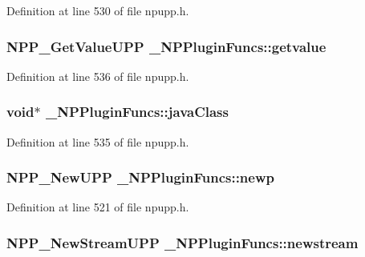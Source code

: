 Definition at line 530 of file npupp.h.

\hypertarget{struct___n_p_plugin_funcs_a15984d23dc460b1ec0c25505ddf00841}{
\subsubsection[{getvalue}]{\setlength{\rightskip}{0pt plus 5cm}NPP\_\-GetValueUPP {\bf \_\-NPPluginFuncs::getvalue}}}
\label{struct___n_p_plugin_funcs_a15984d23dc460b1ec0c25505ddf00841}


Definition at line 536 of file npupp.h.

\hypertarget{struct___n_p_plugin_funcs_af5b980573ff4092423a02ec7bc742f60}{
\subsubsection[{javaClass}]{\setlength{\rightskip}{0pt plus 5cm}void$\ast$ {\bf \_\-NPPluginFuncs::javaClass}}}
\label{struct___n_p_plugin_funcs_af5b980573ff4092423a02ec7bc742f60}


Definition at line 535 of file npupp.h.

\hypertarget{struct___n_p_plugin_funcs_a9aa4547435f9bffb2bc4174e5fac4155}{
\subsubsection[{newp}]{\setlength{\rightskip}{0pt plus 5cm}NPP\_\-NewUPP {\bf \_\-NPPluginFuncs::newp}}}
\label{struct___n_p_plugin_funcs_a9aa4547435f9bffb2bc4174e5fac4155}


Definition at line 521 of file npupp.h.

\hypertarget{struct___n_p_plugin_funcs_a02578ccd3efa3691a1c17052e3525b64}{
\subsubsection[{newstream}]{\setlength{\rightskip}{0pt plus 5cm}NPP\_\-NewStreamUPP {\bf \_\-NPPluginFuncs::newstream}}}
\label{struct___n_p_plugin_funcs_a02578ccd3efa3691a1c17052e3525b64}


